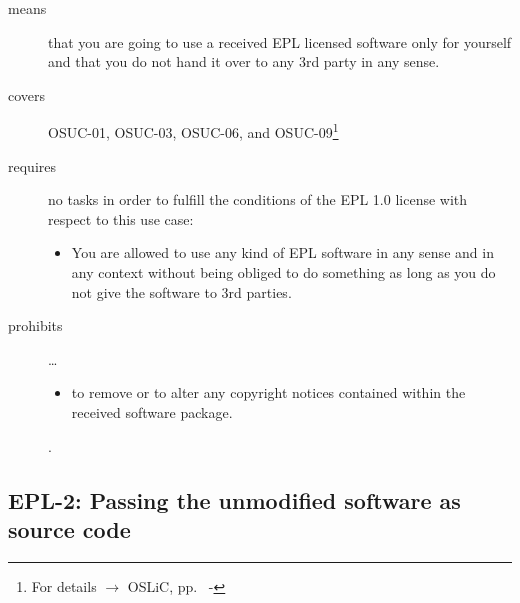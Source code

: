 \begin{description}

\item[means] that you are going to use a received EPL licensed software only
for yourself and that you do not hand it over to any 3rd party in any sense.

\item[covers] OSUC-01, OSUC-03, OSUC-06, and OSUC-09\footnote{For details 
$\rightarrow$ OSLiC, pp.\ \pageref{OSUC-01-DEF} - \pageref{OSUC-09-DEF}}

\item[requires] no tasks in order to fulfill the conditions of the EPL 1.0
license with respect to this use case:
  \begin{itemize}
    \item You are allowed to use any kind of EPL software in any sense and in
    any context without being obliged to do something as long as you do not
    give the software to 3rd parties.
  \end{itemize}

\item[prohibits] \ldots
\begin{itemize}
  \item to remove or to alter any copyright notices contained within the
  received software package.
\end{itemize}.

\end{description}

\subsection{EPL-2: Passing the unmodified software as source code}
\label{OSUC-02-EPL} \label{OSUC-05-EPL} \label{OSUC-07-EPL} 


